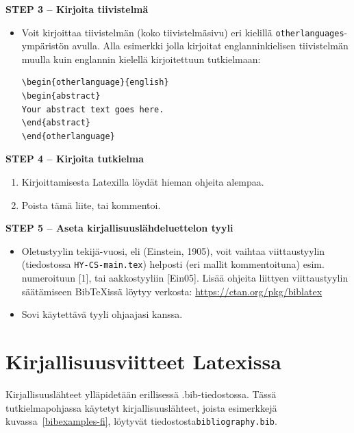 {\textbf{STEP 3 -- Kirjoita tiivistelmä}}

\begin{itemize}
\item Voit kirjoittaa tiivistelmän (koko tiivistelmäsivu) eri kielillä \texttt{otherlanguages}-ym\-pä\-ris\-tön avulla. Alla esimerkki jolla kirjoitat englanninkielisen tiivistelmän muulla kuin englannin kielellä kirjoitettuun tutkielmaan:

\begin{verbatim}
\begin{otherlanguage}{english} 
\begin{abstract}
Your abstract text goes here. 
\end{abstract} 
\end{otherlanguage}
\end{verbatim}

\end{itemize}

{\textbf{STEP 4 -- Kirjoita tutkielma}}

\begin{enumerate}
\item Kirjoittamisesta Latexilla löydät hieman ohjeita alempaa.
\item Poista tämä liite, tai kommentoi.
\end{enumerate}

{\textbf{STEP 5 -- Aseta kirjallisuuslähdeluettelon tyyli}}

\begin{itemize}
\item Oletustyylin tekijä-vuosi, eli (Einstein, 1905), voit vaihtaa viittaustyylin (tiedostossa \texttt{HY-CS-main.tex}) helposti (eri mallit kommentoituna) esim. numeroituun [1], tai aakkostyyliin [Ein05].
Lisää ohjeita liittyen viittaustyylin säätämiseen {Bib}\TeX issä löytyy verkosta: \url{https://ctan.org/pkg/biblatex}
\item Sovi käytettävä tyyli ohjaajasi kanssa. 
\end{itemize}

\section{Kirjallisuusviitteet Latexissa}

Kirjallisuuslähteet ylläpidetään erillisessä .bib-tiedostossa. Tässä tutkielmapohjassa käy\-te\-tyt kirjallisuuslähteet, joista esimerkkejä kuvassa~\ref{bibexamples-fi}, löytyvät tiedostosta\newline \texttt{bibliography.bib}.

